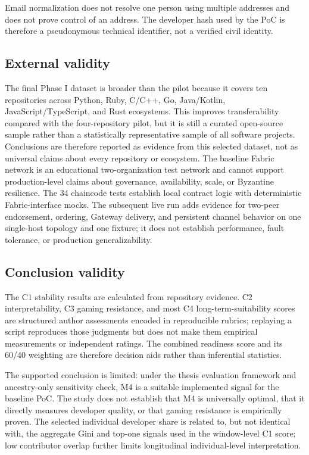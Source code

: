 Email normalization does not resolve one person using multiple addresses and does not prove control of an address.
The developer hash used by the PoC is therefore a pseudonymous technical identifier, not a verified civil identity.

\subsection{External validity}
\label{sec:external_validity}

The final Phase I dataset is broader than the pilot because it covers ten repositories across Python, Ruby,
C/C++, Go, Java/Kotlin, JavaScript/TypeScript, and Rust ecosystems. This improves transferability compared
with the four-repository pilot, but it is still a curated open-source sample rather than a statistically
representative sample of all software projects. Conclusions are therefore reported as evidence from this selected
dataset, not as universal claims about every repository or ecosystem. The baseline Fabric network is an educational
two-organization test network and cannot support production-level claims about governance, availability, scale, or
Byzantine resilience. The 34 chaincode tests establish local contract logic with deterministic Fabric-interface mocks. The
subsequent live run adds evidence for two-peer endorsement, ordering, Gateway delivery, and persistent channel behavior on one
single-host topology and one fixture; it does not establish performance, fault tolerance, or production generalizability.

\subsection{Conclusion validity}
\label{sec:conclusion_validity}

The C1 stability results are calculated from repository evidence. C2 interpretability, C3 gaming resistance, and
most C4 long-term-suitability scores are structured author assessments encoded in reproducible rubrics; replaying a
script reproduces those judgments but does not make them empirical measurements or independent ratings. The combined
readiness score and its 60/40 weighting are therefore decision aids rather than inferential statistics.

The supported conclusion is limited: under the thesis evaluation framework and ancestry-only sensitivity check, M4
is a suitable implemented signal for the baseline PoC. The study does not establish that M4 is universally optimal,
that it directly measures developer quality, or that gaming resistance is empirically proven. The selected individual
developer share is related to, but not identical with, the aggregate Gini and top-one signals used in the window-level
C1 score; low contributor overlap further limits longitudinal individual-level interpretation.

